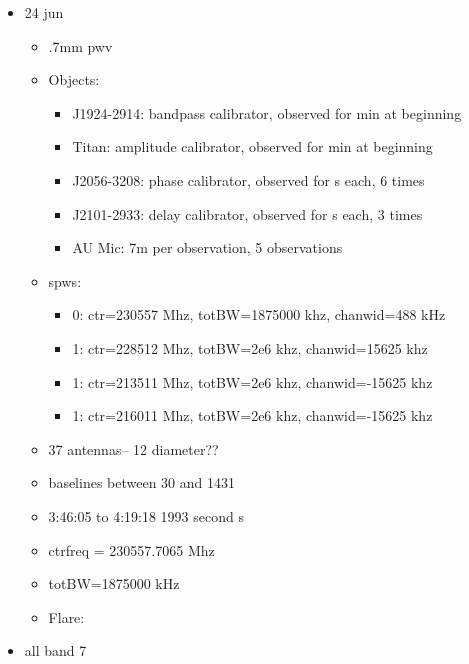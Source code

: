 \documentclass[a4paper]{tufte-handout}
\begin{document}
\begin{itemize}
	\item 24 jun
	      \begin{itemize}
	      	\item \abt .7mm pwv
	      	\item Objects:
	      	      \begin{itemize}
	      	      	\item J1924-2914: bandpass calibrator, observed for  min at beginning
	      	      	\item Titan: amplitude calibrator, observed for  min at beginning
	      	      	\item J2056-3208: phase calibrator, observed for  s each, 6 times
	      	      	\item J2101-2933: delay calibrator, observed for  s each, 3 times
	      	      	\item AU Mic: \abt 7m per observation, 5 observations
	      	      \end{itemize}
	      	\item spws:
	      	      \begin{itemize}
	      	      	\item 0: ctr=230557 Mhz, totBW=1875000 khz, chanwid=488 kHz
	      	      	\item 1: ctr=228512 Mhz, totBW=2e6 khz, chanwid=15625 khz
	      	      	\item 1: ctr=213511 Mhz, totBW=2e6 khz, chanwid=-15625 khz
	      	      	\item 1: ctr=216011 Mhz, totBW=2e6 khz, chanwid=-15625 khz
	      	      \end{itemize}
	      	\item 37 antennas-- 12 diameter??
	      	\item baselines between 30 and 1431
	      	\item 3:46:05 to 4:19:18 1993 second  s
	      	\item ctrfreq = 230557.7065 Mhz
	      	\item totBW=1875000 kHz
	      	\item Flare:
	      \end{itemize}

	\item all band 7

\end{itemize}

\hrulefill

\end{document}
